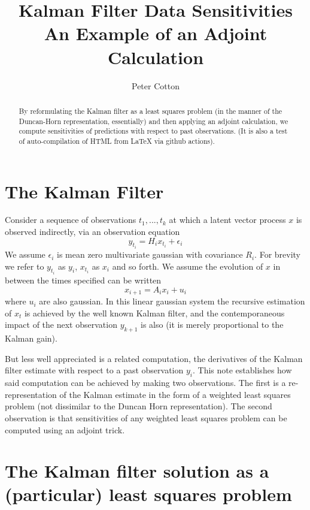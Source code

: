 \documentclass[a4paper,11pt]{article}
\title{Kalman Filter Data Sensitivities \\ An Example of an Adjoint Calculation}
\author{Peter Cotton}
\date{}
\begin{document}
\maketitle

\begin{abstract}
By reformulating the Kalman filter as a least squares problem (in the manner of the Duncan-Horn representation, essentially) and then applying an adjoint calculation, we compute sensitivities of predictions with respect to past observations. (It is also a test of auto-compilation of HTML from LaTeX via github actions). 
\end{abstract}

\section{The Kalman Filter}

Consider a sequence of observations $t_1,...,t_k$ at which a latent vector process $x$ is observed indirectly, via an observation equation \begin{equation} y_{t_i} = H_i x_{t_i} + \epsilon_i \end{equation} We assume $\epsilon_i$ is mean zero multivariate gaussian with covariance $R_i$. For brevity we refer to $y_{t_i}$ as $y_i$, $x_{t_i}$ as $x_i$ and so forth. We assume the evolution of $x$ in between the times specified can be written \begin{equation} x_{i+1} = A_i x_i + u_i \end{equation} where $u_i$ are also gaussian. In this linear gaussian system the recursive estimation of $x_t$ is achieved by the well known Kalman filter, and the contemporaneous impact of the next observation $y_{k+1}$ is also (it is merely proportional to the Kalman gain).

But less well appreciated is a related computation, the derivatives of the Kalman filter estimate with respect to a past observation $y_i$. This note establishes how said computation can be achieved by making two observations. The first is a re-representation of the Kalman estimate in the form of a weighted least squares problem (not dissimilar to the Duncan Horn representation). The second observation is that sensitivities of any weighted least squares problem can be computed using an adjoint trick.

\section{The Kalman filter solution as a (particular) least squares problem}
\end{document}

